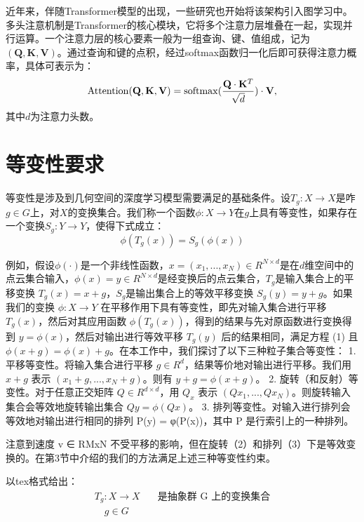 近年来，伴随Transformer模型的出现，一些研究也开始将该架构引入图学习中。多头注意机制是Transformer的核心模块，它将多个注意力层堆叠在一起，实现并行运算。一个注意力层的核心要素一般为一组查询、键、值组成，记为$(\mathbf{Q}, \mathbf{K}, \mathbf{V})$。通过查询和键的点积，经过softmax函数归一化后即可获得注意力概率，具体可表示为：
\begin{eqnarray}
    {\rm Attention}(\mathbf{Q}, \mathbf{K}, \mathbf{V}) = {\rm softmax}(\frac{\mathbf{Q} \cdot \mathbf{K}^T}{\sqrt{d}}) \cdot \mathbf{V},
\end{eqnarray}
其中$d$为注意力头数。

\section{等变性要求}
等变性是涉及到几何空间的深度学习模型需要满足的基础条件。设$T_g: X \to X$是咋$g \in G$上，对$X$的变换集合。我们称一个函数$\phi: X \to Y$在$g$上具有等变性，如果存在一个变换$S_g: Y \to Y$，使得下式成立：
\begin{equation}
    \phi (T_g(x)) = S_g(\phi (x))
\end{equation}

例如，假设$\phi (\cdot)$是一个非线性函数，$x = (x_1, ..., x_N) \in R^{N \times d}$是在$d$维空间中的点云集合输入，$\phi (x) = y \in R^{N \times d}$是经变换后的点云集合，$T_g$是输入集合上的平移变换 $T_g (x) = x + g$，$S_g$是输出集合上的等效平移变换 $S_g(y) = y + g$。如果我们的变换 $\phi : X \to Y$ 在平移作用下具有等变性，即先对输入集合进行平移 $T_g(x)$，然后对其应用函数 $\phi(T_g(x))$，得到的结果与先对原函数进行变换得到 $y = \phi(x)$，然后对输出进行等效平移 $T_g(y)$ 后的结果相同，满足方程 (1) 且 $\phi (x+g) = \phi (x) + g$。在本工作中，我们探讨了以下三种粒子集合等变性：
1. 平移等变性。将输入集合进行平移 $g \in R^d$，结果等价地对输出进行平移。我们用 $x + g$ 表示 $(x_1+g, ..., x_N + g)$。则有 $y+g = \phi (x+g)$。
2. 旋转（和反射）等变性。对于任意正交矩阵 $Q \in R^{d \times d}$，用 $Q_x$ 表示 $(Qx_1, ..., Qx_N)$。则旋转输入集合会等效地旋转输出集合 $Qy = \phi(Qx)$。
3. 排列等变性。对输入进行排列会等效地对输出进行相同的排列 P(y) = φ(P(x))，其中 P 是行索引上的一种排列。

注意到速度 v ∈ RMxN 不受平移的影响，但在旋转（2）和排列（3）下是等效变换的。在第3节中介绍的我们的方法满足上述三种等变性约束。

以tex格式给出：
\begin{align*}
T_g: X \rightarrow X & \quad \text{是抽象群 G 上的变换集合} \\
\quad g \in G
\end{align*}

